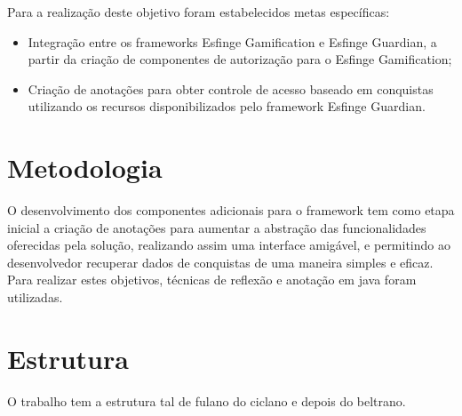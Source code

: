 \par Para a realização deste objetivo foram estabelecidos metas específicas:
\begin{itemize}
    \item Integração entre os frameworks Esfinge Gamification e Esfinge Guardian, a partir da criação de componentes de autorização para o Esfinge Gamification;
    \item Criação de anotações para obter controle de acesso baseado em conquistas utilizando os recursos disponibilizados pelo framework Esfinge Guardian.
\end{itemize}

\section{Metodologia}

\par O desenvolvimento dos componentes adicionais para o framework tem como etapa inicial a criação de anotações para aumentar a abstração das funcionalidades oferecidas pela solução, realizando assim uma interface amigável, e permitindo ao desenvolvedor recuperar dados de conquistas de uma maneira simples e eficaz. Para realizar estes objetivos, técnicas de reflexão e anotação em java foram utilizadas.

\section{Estrutura}

\par O trabalho tem a estrutura tal de fulano do ciclano e depois do beltrano.